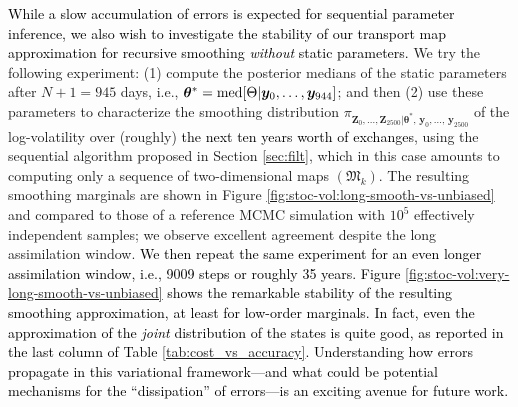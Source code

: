 \documentclass[twoside,11pt]{article}
\newcommand{\yb}{\boldsymbol{y}}
\newcommand{\Zb}{\boldsymbol{Z}}
\newcommand{\thetab}{\boldsymbol{\theta}}                              %
\newcommand{\submap}{\mathfrak{M}}
\newcommand{\hrevone}{\textcolor{black} }
\begin{document}
\hrevone{While a slow accumulation of errors is expected for sequential parameter inference,
we also wish
to investigate the stability of our transport map
approximation for %
recursive smoothing {\it without} static parameters.
}
%
We try the following experiment: (1) compute the
posterior medians of the static parameters after $N+1=945$ days, i.e., 
$\thetab^* = {\rm med}[\Theta \vert \yb_0 ,\ldots, \yb_{944} ]$; and then (2) use these
parameters to characterize the smoothing distribution $\pi_{\Zb_{0}
,\ldots, \Zb_{2500} \vert \thetab^\ast, \,\yb_{0}, \ldots,
\,\yb_{2500}}$ of the log-volatility over (roughly) \hrevone{the next ten
years worth of exchanges}, 
%
using the sequential algorithm proposed in Section \ref{sec:filt}, which in this case
amounts to computing only a sequence of two-dimensional maps $(\submap_k)$.
The resulting smoothing marginals are shown in Figure
\ref{fig:stoc-vol:long-smooth-vs-unbiased}  and compared to those of a
reference MCMC 
simulation with $10^5$ effectively independent samples; we observe excellent agreement despite the long
assimilation window.
\hrevone{We then repeat the same experiment for an even longer assimilation
window, i.e., 9009 steps or roughly 35 years.
Figure \ref{fig:stoc-vol:very-long-smooth-vs-unbiased} 
shows the remarkable stability of the resulting smoothing approximation, at
least for low-order marginals. In fact, even the approximation of the \emph{joint} distribution of the states is quite good, as reported in the last
column of Table \ref{tab:cost_vs_accuracy}.
Understanding how errors propagate in this variational framework---and what could be potential
mechanisms for the ``dissipation'' of errors---is an exciting avenue for future work.
}
\end{document}
